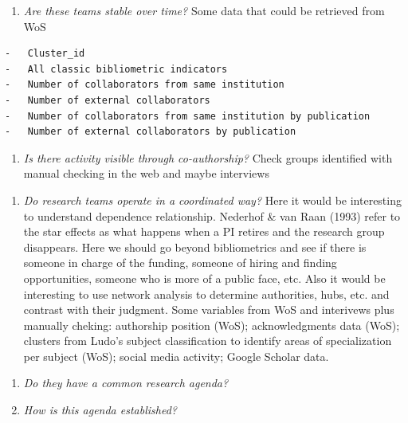 \documentclass[]{elsarticle} %
\providecommand{\tightlist}{%
  \setlength{\itemsep}{0pt}\setlength{\parskip}{0pt}}
\begin{document}
\begin{enumerate}
\def\labelenumi{\roman{enumi}.}
\tightlist
\item
  \emph{Are these teams stable over time?} Some data that could be
  retrieved from WoS
\end{enumerate}

\begin{verbatim}
-   Cluster_id
-   All classic bibliometric indicators
-   Number of collaborators from same institution
-   Number of external collaborators
-   Number of collaborators from same institution by publication
-   Number of external collaborators by publication
\end{verbatim}

\begin{enumerate}
\def\labelenumi{\roman{enumi}.}
\setcounter{enumi}{1}
\tightlist
\item
  \emph{Is there activity visible through co-authorship?} Check groups
  identified with manual checking in the web and maybe interviews
\end{enumerate}

\begin{enumerate}
\def\labelenumi{\arabic{enumi}.}
\setcounter{enumi}{1}
\tightlist
\item
  \emph{Do research teams operate in a coordinated way?} Here it would
  be interesting to understand dependence relationship. Nederhof \& van
  Raan (1993) refer to the star effects as what happens when a PI
  retires and the research group disappears. Here we should go beyond
  bibliometrics and see if there is someone in charge of the funding,
  someone of hiring and finding opportunities, someone who is more of a
  public face, etc. Also it would be interesting to use network analysis
  to determine authorities, hubs, etc. and contrast with their judgment.
  Some variables from WoS and interivews plus manually cheking:
  authorship position (WoS); acknowledgments data (WoS); clusters from
  Ludo's subject classification to identify areas of specialization per
  subject (WoS); social media activity; Google Scholar data.
\end{enumerate}

\begin{enumerate}
\def\labelenumi{\roman{enumi}.}
\tightlist
\item
  \emph{Do they have a common research agenda?}
\item
  \emph{How is this agenda established?}
\end{enumerate}
\end{document}

